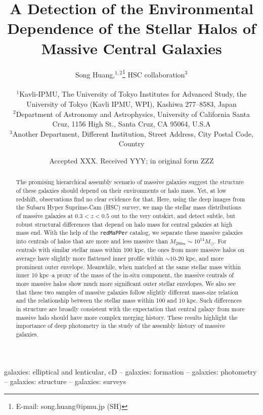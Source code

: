 \documentclass[a4paper,fleqn,usenatbib]{mnras}
\title[Structure and Halo of Massive Galaxies]{A Detection of the Environmental 
       Dependence of the Stellar Halos of Massive Central Galaxies}
\author[S. Huang et al.]{Song Huang,$^{1,2}$\thanks{E-mail: song.huang@ipmu.jp (SH)}
        HSC collaboration$^{3}$   
        \\ \\
        $^{1}$Kavli-IPMU, The University of Tokyo Institutes for Advanced Study, 
              the University of Tokyo (Kavli IPMU, WPI), Kashiwa 277--8583, Japan\\
        $^{2}$Department of Astronomy and Astrophysics, University of California 
              Santa Cruz, 1156 High St., Santa Cruz, CA 95064, U.S.A\\
        $^{3}$Another Department, Different Institution, Street Address, City Postal 
              Code, Country
        }
\date{Accepted XXX. Received YYY; in original form ZZZ}
\def\redm{\texttt{redMaPPer}}
\begin{document}
\label{firstpage}
\pagerange{\pageref{firstpage}--\pageref{lastpage}}

\maketitle


\begin{abstract}
    
    The promising hierarchical assembly scenario of massive galaxies suggest the 
    structure of these galaxies should depend on their environments or halo mass.
    Yet, at low redshift, observations find no clear evidence for that. 
    Here, using the deep images from the Subaru Hyper Suprime-Cam (HSC) survey,
    we map the stellar mass distributions of massive galaxies at $0.3 < z < 0.5$ 
    out to the very outskirt, and detect subtle, but robust structural differences 
    that depend on halo mass for central galaxies at high mass end. 
    With the help of the \redm{} catalog, we separate these massive galaxies 
    into centrals of halos that are more and less massive than 
    $M_{200m}\sim 10^{14} M_{\odot}$.
    For centrals with similar stellar mass within 100 kpc, the ones from 
    more massive halos on average have slightly more flattened inner profile 
    within $\sim 10$-$20$ kpc, and more prominent outer envelope.
    Meanwhile, when matched at the same stellar mass within inner 10 kpc--a 
    proxy of the mass of the in-situ component, the massive centrals of more  
    massive halos show much more significant outer stellar envelopes.    
    We also see that these two samples of massive galaxies follow slightly 
    different mass-size relation and the relationship between the stellar mass 
    within 100 and 10 kpc.
    Such differences in structure are broadly consistent with the expectation that
    central galaxy from more massive halo should have more complex merging history.
    These results highlight the importance of deep photometry in the study of 
    the assembly history of massive galaxies.  

\end{abstract}

\begin{keywords}
    galaxies: elliptical and lenticular, cD --
    galaxies: formation --
    galaxies: photometry -- 
    galaxies: structure -- 
    galaxies: surveys
\end{keywords}
\end{document}
